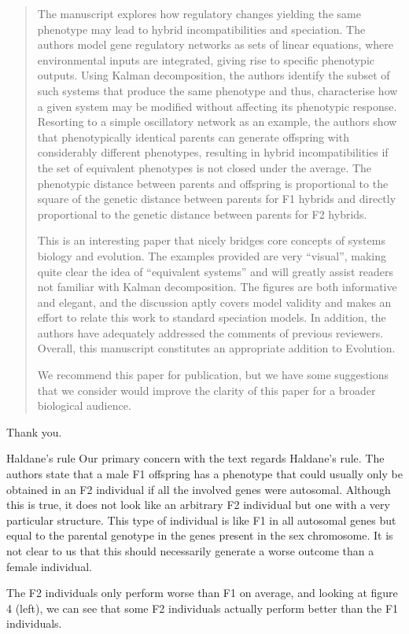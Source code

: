 
\begin{quote}
The manuscript explores how regulatory changes yielding the same phenotype may lead to hybrid incompatibilities and speciation. The authors model gene regulatory networks as sets of linear equations, where environmental inputs are integrated, giving rise to specific phenotypic outputs. Using Kalman decomposition, the authors identify the subset of such systems that produce the same phenotype and thus, characterise how a given system may be modified without affecting its phenotypic response. Resorting to a simple oscillatory network as an example, the authors show that phenotypically identical parents can generate offspring with considerably different phenotypes, resulting in hybrid incompatibilities if the set of equivalent phenotypes is not closed under the average. The phenotypic distance between parents and offspring is proportional to the square of the genetic distance between parents for F1 hybrids and directly proportional to the genetic distance between parents for F2 hybrids.

This is an interesting paper that nicely bridges core concepts of systems biology and evolution. The examples provided are very ``visual'', making quite clear the idea of ``equivalent systems'' and will greatly assist readers not familiar with Kalman decomposition. The figures are both informative and elegant, and the discussion aptly covers model validity and makes an effort to relate this work to standard speciation models. In addition, the authors have adequately addressed the comments of previous reviewers. Overall, this manuscript constitutes an appropriate addition to Evolution.

We recommend this paper for publication, but we have some suggestions that we consider would improve the clarity of this paper for a broader biological audience.
\end{quote}

Thank you. 

\begin{point}{Haldane's rule}
Our primary concern with the text regards Haldane's rule. The authors state that a male F1 offspring has a phenotype that could usually only be obtained in an F2 individual if all the involved genes were autosomal. Although this is true, it does not look like an arbitrary F2 individual but one with a very particular structure. This type of individual is like F1 in all autosomal genes but equal to the parental genotype in the genes present in the sex chromosome. It is not clear to us that this should necessarily generate a worse outcome than a female individual.

The F2 individuals only perform worse than F1 on average, and looking at figure 4 (left), we can see that some F2 individuals actually perform better than the F1 individuals.
\end{point}

